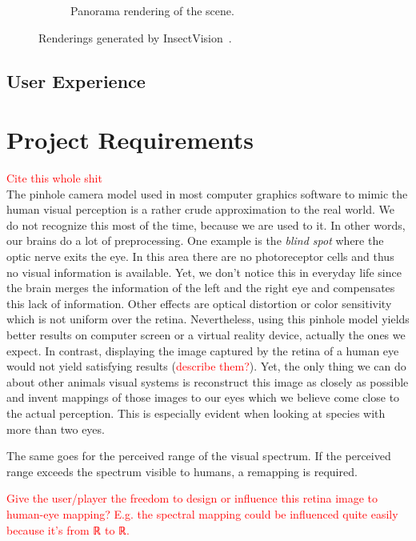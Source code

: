 \documentclass{acm_proc_article-sp}
\newcommand{\todo}[1]{\textcolor{Red}{#1}}
\begin{document}
\begin{centering}
\begin{figure}
\begin{subfigure}[t]{0.3255\textwidth}
    \caption{Panorama rendering of the scene.}
    \label{beeviewpanorama}
  \end{subfigure}
  \caption{Renderings generated by InsectVision \cite{insectvision}.}
\end{figure}
\end{centering}

\subsection{User Experience}

\section{Project Requirements}
\todo{Cite this whole shit}\\
The pinhole camera model used in most computer graphics software to mimic
the human visual perception is a rather crude approximation to the real world.
We do not recognize this most of the time, because we are used to it. In other
words, our brains do a lot of preprocessing.
One example is the \emph{blind spot} where the optic nerve exits the eye.
In this area there are no photoreceptor cells and thus no visual information is
available. Yet, we don't notice this in everyday life since the brain merges
the information of the left and the right eye and compensates this lack of
information. Other effects are optical distortion or color sensitivity which
is not uniform over the retina.
Nevertheless, using this pinhole model yields better results on computer screen
or a virtual reality device, actually the ones we expect. In contrast,
displaying the image captured by the retina of a human eye would not yield
satisfying results (\todo{describe them?}).
Yet, the only thing we can do about other animals visual systems is reconstruct
this image as closely as possible and invent mappings of those images to our
eyes which we believe come close to the actual perception.
This is especially evident when looking at species with more than two eyes.

The same goes for the perceived range of the visual spectrum. If the perceived
range exceeds the spectrum visible to humans, a remapping is required.

\todo{Give the user/player the freedom to design or influence this retina image
to human-eye mapping? E.g. the spectral mapping could be influenced quite easily
because it's from ℝ to ℝ.}
\end{document}
